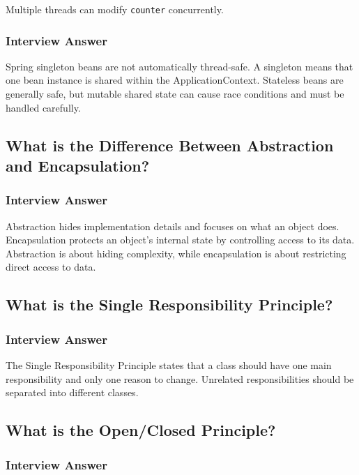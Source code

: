 \documentclass[12pt,a4paper]{article}
\begin{document}
Multiple threads can modify \texttt{counter} concurrently.

\subsubsection*{Interview Answer}

Spring singleton beans are not automatically thread-safe. A singleton means
that one bean instance is shared within the ApplicationContext. Stateless
beans are generally safe, but mutable shared state can cause race
conditions and must be handled carefully.

\subsection{What is the Difference Between Abstraction and Encapsulation?}

\subsubsection*{Interview Answer}

Abstraction hides implementation details and focuses on what an object does.
Encapsulation protects an object's internal state by controlling access to
its data. Abstraction is about hiding complexity, while encapsulation is
about restricting direct access to data.

\subsection{What is the Single Responsibility Principle?}

\subsubsection*{Interview Answer}

The Single Responsibility Principle states that a class should have one
main responsibility and only one reason to change. Unrelated responsibilities
should be separated into different classes.

\subsection{What is the Open/Closed Principle?}

\subsubsection*{Interview Answer}
\end{document}
